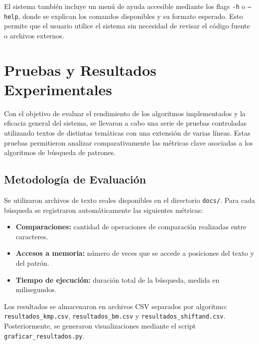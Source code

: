 \documentclass[9pt,letterpaper,onecolumn]{rho-class/rho}
\begin{document}
El sistema también incluye un menú de ayuda accesible mediante los flags \texttt{-h} o \texttt{--help}, donde se explican los comandos disponibles y su formato esperado. Esto permite que el usuario utilice el sistema sin necesidad de revisar el código fuente o archivos externos.




\section{Pruebas y Resultados Experimentales}
\label{sec:experimentos}

Con el objetivo de evaluar el rendimiento de los algoritmos implementados y la eficacia general del sistema, se llevaron a cabo una serie de pruebas controladas utilizando textos de distintas temáticas con una extensión de varias líneas. Estas pruebas permitieron analizar comparativamente las métricas clave asociadas a los algoritmos de búsqueda de patrones.

\subsection{Metodología de Evaluación}

Se utilizaron archivos de texto reales disponibles en el directorio \texttt{docs/}. Para cada búsqueda se registraron automáticamente las siguientes métricas:

\begin{itemize}
    \item \textbf{Comparaciones:} cantidad de operaciones de comparación realizadas entre caracteres.
    \item \textbf{Accesos a memoria:} número de veces que se accede a posiciones del texto y del patrón.
    \item \textbf{Tiempo de ejecución:} duración total de la búsqueda, medida en milisegundos.
\end{itemize}

Los resultados se almacenaron en archivos CSV separados por algoritmo: \texttt{resultados\_kmp.csv}, \texttt{resultados\_bm.csv} y \texttt{resultados\_shiftand.csv}. Posteriormente, se generaron visualizaciones mediante el script \texttt{graficar\_resultados.py}.
\end{document}
